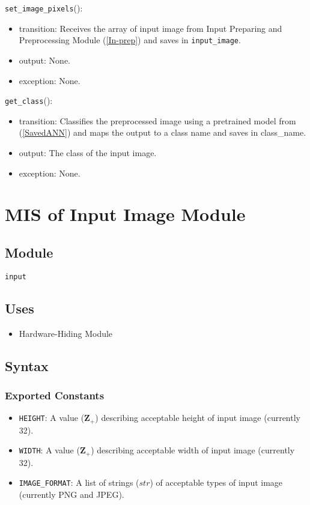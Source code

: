 \documentclass[12pt, titlepage]{article}
\def\code#1{\texttt{#1}}
\begin{document}
\noindent \code{set\_image\_pixels}():
\begin{itemize}
  \item transition: Receives the array of input image from Input Preparing and Preprocessing Module (\ref{In-prep}) 
  and saves in \code{input\_image}.
  \item output: None.
  \item exception: None.
\end{itemize}

\noindent \code{get\_class}():
\begin{itemize}
  \item transition: Classifies the preprocessed image using a pretrained model from (\ref{SavedANN}) and 
                    maps the output to a class name and saves in {class\_name}.
  \item output: The class of the input image.
  \item exception: None.
\end{itemize}

\newpage

\section{MIS of Input Image Module} \label{In-set} 

\subsection{Module}
\code{input} 

\subsection{Uses}
\begin{itemize}
  \item Hardware-Hiding Module  
\end{itemize}


\subsection{Syntax}

\subsubsection{Exported Constants}
\begin{itemize}
  \item \code{HEIGHT}: A value ($\mathbf{Z}_{+}$) describing acceptable height of input image 
  (currently 32).
  \item \code{WIDTH}: A value ($\mathbf{Z}_{+}$) describing acceptable width of input image
  (currently 32).
  \item \code{IMAGE\_FORMAT}: A list of strings ($str$) of acceptable types of input image 
  (currently PNG and JPEG).
\end{itemize}
\end{document}
